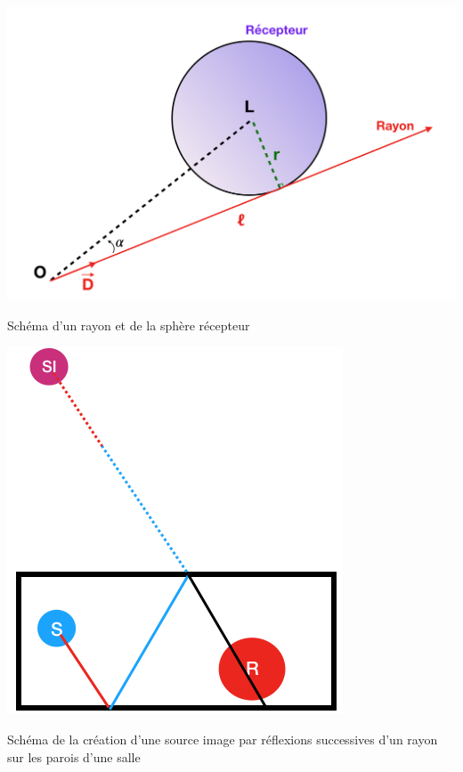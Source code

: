 \begin{figureth}
	\begin{subfigureth}{0.55\textwidth}
			\includegraphics[width=\linewidth]{images/touche}
			\caption{Schéma d'un rayon et de la sphère récepteur}
			\label{touche}
		\end{subfigureth}
		\qquad
		\begin{subfigureth}{0.35\textwidth}
			\includegraphics[width=\linewidth]{images/schema_SI}
			\caption{Schéma de la création d'une source image par réflexions successives d'un rayon sur les parois d'une salle}
			\label{schema_SI}
	\end{subfigureth}
\end{figureth}


